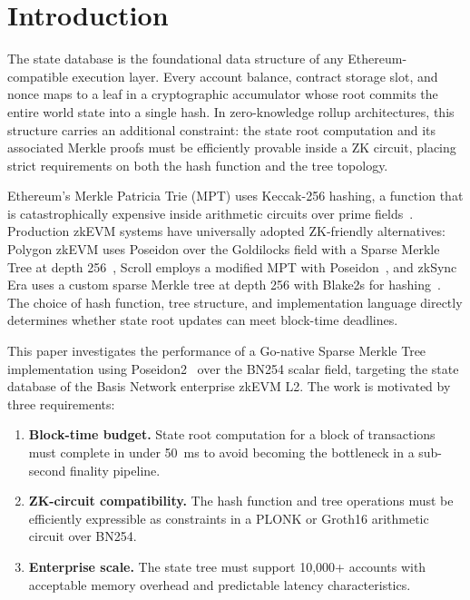 \section{Introduction}
\label{sec:introduction}

The state database is the foundational data structure of any
Ethereum-compatible execution layer. Every account balance, contract
storage slot, and nonce maps to a leaf in a cryptographic accumulator
whose root commits the entire world state into a single hash. In
zero-knowledge rollup architectures, this structure carries an
additional constraint: the state root computation and its associated
Merkle proofs must be efficiently provable inside a ZK circuit, placing
strict requirements on both the hash function and the tree topology.

Ethereum's Merkle Patricia Trie (MPT) uses Keccak-256 hashing, a
function that is catastrophically expensive inside arithmetic circuits
over prime fields~\cite{grassi2021poseidon}. Production zkEVM systems
have universally adopted ZK-friendly alternatives: Polygon zkEVM uses
Poseidon over the Goldilocks field with a Sparse Merkle Tree at depth
256~\cite{polygon2024zkprover}, Scroll employs a modified
MPT with Poseidon~\cite{scroll2024architecture}, and zkSync Era uses
a custom sparse Merkle tree at depth 256 with Blake2s for
hashing~\cite{zksync2024boojum}. The choice of hash function, tree
structure, and implementation language directly determines whether
state root updates can meet block-time deadlines.

This paper investigates the performance of a Go-native Sparse Merkle
Tree implementation using Poseidon2~\cite{grassi2023poseidon2} over
the BN254 scalar field, targeting the state database of the Basis
Network enterprise zkEVM L2. The work is motivated by three
requirements:

\begin{enumerate}
  \item \textbf{Block-time budget.} State root computation for a
    block of transactions must complete in under 50~ms to avoid
    becoming the bottleneck in a sub-second finality pipeline.
  \item \textbf{ZK-circuit compatibility.} The hash function and
    tree operations must be efficiently expressible as constraints
    in a PLONK or Groth16 arithmetic circuit over BN254.
  \item \textbf{Enterprise scale.} The state tree must support
    10,000+ accounts with acceptable memory overhead and predictable
    latency characteristics.
\end{enumerate}

